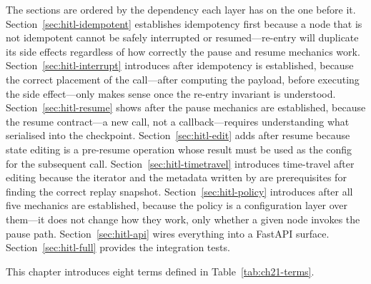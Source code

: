 The sections are ordered by the dependency each layer has on the one before
it. Section~\ref{sec:hitl-idempotent} establishes idempotency first because
a node that is not idempotent cannot be safely interrupted or
resumed---re-entry will duplicate its side effects regardless of how
correctly the pause and resume mechanics work.
Section~\ref{sec:hitl-interrupt} introduces  after
idempotency is established, because the correct placement of the call---after
computing the payload, before executing the side effect---only makes sense
once the re-entry invariant is understood.
Section~\ref{sec:hitl-resume} shows  after the
pause mechanics are established, because the resume contract---a new
 call, not a callback---requires understanding what
 serialised into the checkpoint.
Section~\ref{sec:hitl-edit} adds  after resume because
state editing is a pre-resume operation whose result must be used as the
config for the subsequent  call.
Section~\ref{sec:hitl-timetravel} introduces time-travel after editing
because the  iterator and the 
metadata written by  are prerequisites for finding the
correct replay snapshot.
Section~\ref{sec:hitl-policy} introduces  after all five
mechanics are established, because the policy is a configuration layer over
them---it does not change how they work, only whether a given node invokes
the pause path.
Section~\ref{sec:hitl-api} wires everything into a FastAPI surface.
Section~\ref{sec:hitl-full} provides the integration tests.

This chapter introduces eight terms defined in Table~\ref{tab:ch21-terms}.

